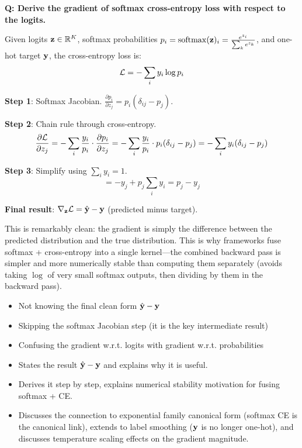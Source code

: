 \begin{interviewq}
\textbf{Q: Derive the gradient of softmax cross-entropy loss with respect to the logits.}

 \quad {} \quad \badgefreq{\freqhigh}

\stronganswer
Given logits $\mathbf{z} \in \mathbb{R}^K$, softmax probabilities $p_i = \operatorname{softmax}(\mathbf{z})_i = \frac{e^{z_i}}{\sum_k e^{z_k}}$, and one-hot target $\mathbf{y}$, the cross-entropy loss is:
$$\mathcal{L} = -\sum_i y_i \log p_i$$

\textbf{Step 1}: Softmax Jacobian. $\frac{\partial p_i}{\partial z_j} = p_i(\delta_{ij} - p_j)$.

\textbf{Step 2}: Chain rule through cross-entropy.
$$\frac{\partial \mathcal{L}}{\partial z_j} = -\sum_i \frac{y_i}{p_i} \cdot \frac{\partial p_i}{\partial z_j} = -\sum_i \frac{y_i}{p_i} \cdot p_i(\delta_{ij} - p_j) = -\sum_i y_i(\delta_{ij} - p_j)$$

\textbf{Step 3}: Simplify using $\sum_i y_i = 1$.
$$= -y_j + p_j \sum_i y_i = p_j - y_j$$

\textbf{Final result}: $\nabla_{\mathbf{z}} \mathcal{L} = \hat{\mathbf{y}} - \mathbf{y}$ (predicted minus target).

This is remarkably clean: the gradient is simply the difference between the predicted distribution and the true distribution. This is why frameworks fuse softmax + cross-entropy into a single kernel---the combined backward pass is simpler and more numerically stable than computing them separately (avoids taking $\log$ of very small softmax outputs, then dividing by them in the backward pass).

\redflags
\begin{itemize}
    \item Not knowing the final clean form $\hat{\mathbf{y}} - \mathbf{y}$
    \item Skipping the softmax Jacobian step (it is the key intermediate result)
    \item Confusing the gradient w.r.t. logits with gradient w.r.t. probabilities
\end{itemize}


\goodgreat
\begin{itemize}
    \item {} States the result $\hat{\mathbf{y}} - \mathbf{y}$ and explains why it is useful.
    \item {} Derives it step by step, explains numerical stability motivation for fusing softmax + CE.
    \item {} Discusses the connection to exponential family canonical form (softmax CE is the canonical link), extends to label smoothing ($\mathbf{y}$ is no longer one-hot), and discusses temperature scaling effects on the gradient magnitude.
\end{itemize}


\end{interviewq}
